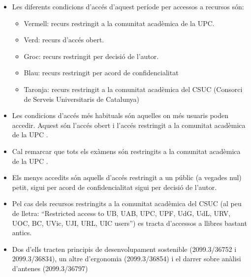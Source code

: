\begin{itemize}
    \item Les diferents condicions d'accés d'aquest període per accessos a recursos són:
    \begin{itemize}
        \item Vermell: recurs restringit a la comunitat acadèmica de la UPC.
        \item Verd: recurs d'accés obert.
        \item Groc: recurs restringit per decisió de l'autor.
        \item Blau: recurs restringit per acord de confidencialitat
        \item Taronja: recurs restringit a la comunitat acadèmica del CSUC (Consorci de Serveis Universitaris de Catalunya)
    \end{itemize}

    \item Les condicions d'accés més habituals són aquelles on més usuaris poden accedir.
    Aquest són l'accés obert i l'accés restringit a la comunitat acadèmica de la UPC .
    \item Cal remarcar que tots els exàmens són restringits a la comunitat acadèmica de la UPC .
    \item Els menys accedits són aquells d'accés restringit a un públic (a vegades nul) petit, sigui per acord de confidencialitat sigui per decisió de l'autor.
    \clearpage
    \item Pel cas dels recursos restringits a la comunitat acadèmica del CSUC (al peu de lletra: “Restricted access to UB, UAB, UPC, UPF, UdG, UdL, URV, UOC, BC, UVic, UJI, URL, UIC users”) es tracta d'accessos a llibres bastant antics.
    \item Dos d'ells tracten principis de desenvolupament sostenible (2099.3/36752 i 2099.3/36834), un altre d'ergonomia (2099.3/36854) i el darrer sobre anàlisi d'antenes (2099.3/36797)

\end{itemize}